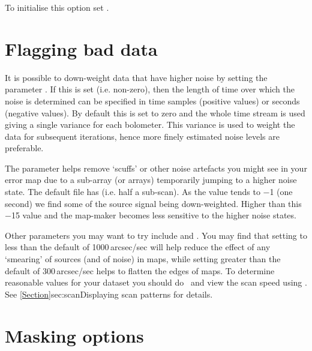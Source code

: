 \documentclass[11pt,oneside,chapters]{starlink}
\begin{document}
To initialise this option set .


\section{Flagging bad data}
\label{sec:noibox}

It is possible to down-weight data that have higher noise by setting
the parameter . If this is set (i.e. non-zero),
then the length of time over which the noise is determined can be
specified in time samples (positive values) or seconds (negative
values). By default this is set to zero and the whole time stream is
used giving a single variance for each bolometer. This variance is
used to weight the data for subsequent iterations, hence more finely
estimated noise levels are preferable.

The parameter  helps remove `scuffs' or other
noise artefacts you might see in your error map due to a sub-array (or
arrays) temporarily jumping to a higher noise state. The default file
has  (i.e. half a sub-scan). As the
value tends to $-$1 (one second) we find some of the source signal being
down-weighted. Higher than this $-$15 value and the map-maker becomes
less sensitive to the higher noise states.

Other parameters you may want to try include  and
. You may find that setting  to less
than the default of 1000\,arcsec/sec will help reduce the effect of any
`smearing' of sources (and of noise) in maps, while setting
 greater than the default of 300\,arcsec/sec helps to
flatten the edges of maps. To determine reasonable values for your
 dataset you should do \jcmtstate\ and view the scan speed using
\topcat. See \cref{Section}{sec:scan}{Displaying scan patterns} for
details.


\section{Masking options}
\label{sec:mask}
\end{document}
